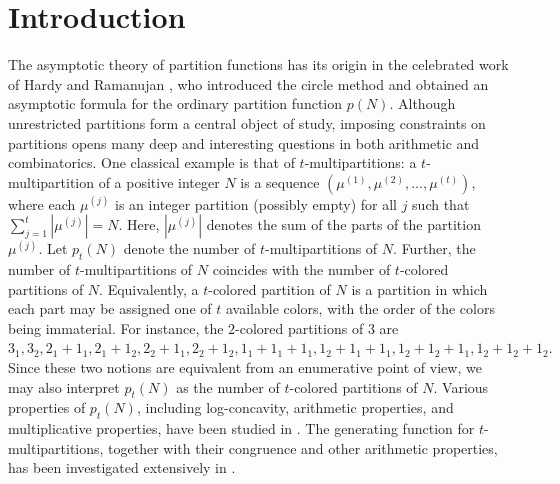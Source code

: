 \documentclass[10pt,a4paper]{amsart}
\numberwithin{equation}{section}
\begin{document}
	\section{Introduction}\label{section1} 
	The asymptotic theory of partition functions has its origin in the celebrated work of Hardy and Ramanujan \cite{hardy1918asymptotic}, who introduced the circle method and obtained an asymptotic formula for the ordinary partition function $p(N)$. 
	Although unrestricted partitions form a central object of study, imposing constraints on partitions opens many deep and interesting questions in both arithmetic and combinatorics.
	One classical example is that of $t$-multipartitions: a $t$-multipartition of a positive integer $N$ is a sequence $\left(\mu^{(1)},\mu^{(2)},\ldots,\mu^{(t)}\right)$, where each $\mu^{(j)}$ is an integer partition (possibly empty) for all $j$ such that $\sum_{j=1}^{t}\left|\mu^{(j)}\right|=N$. Here, $\left|\mu^{(j)}\right|$ denotes the sum of the parts of the partition $\mu^{(j)}$. Let $p_{t}(N)$ denote the number of $t$-multipartitions of $N$. Further, the number of $t$-multipartitions of $N$ coincides with the number of $t$-colored partitions of $N$. Equivalently, a $t$-colored partition of $N$ is a partition in which each part may be assigned one of $t$ available colors, with the order of the colors being immaterial. For instance, the $2$-colored partitions of $3$ are $3_1, 3_2, 2_1+1_1, 2_1+1_2, 2_2+1_1,2_2+1_2,1_1+1_1+1_1, 1_2+1_1+1_1, 1_2+1_2+1_1, 1_2+1_2+1_2.$ 
	Since these two notions are equivalent from an enumerative point of view, we may also interpret $p_t(N)$ as the number of $t$-colored partitions of $N$. Various properties of $p_t(N)$, including log-concavity, arithmetic properties, and multiplicative properties, have been studied in \cite{bringmann, bringmann1, chern}. The generating function for $t$-multipartitions, together with their congruence and other arithmetic properties, has been investigated extensively in \cite{andrews, atkin, chen2014}. 
	
\end{document}
